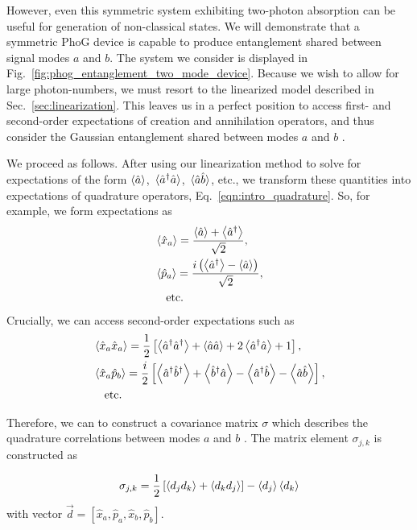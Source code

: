 However, even this symmetric system exhibiting two-photon absorption can be useful for generation of non-classical states. We will demonstrate that a symmetric PhoG device is capable to produce entanglement shared between signal modes $a$ and $b$. The system we consider is displayed in Fig.~\ref{fig:phog_entanglement_two_mode_device}. Because we wish to allow for large photon-numbers, we must resort to the linearized model described in Sec.~\ref{sec:linearization}. This leaves us in a perfect position to access first- and second-order expectations of creation and annihilation operators, and thus consider the Gaussian entanglement shared between modes $a$ and $b$ \cite{Weedbrook2012, Adesso2007a, Simon2000}.

We proceed as follows. After using our linearization method to solve for expectations of the form $\ev{\hat{a}}$, $\ev*{\hat{a}^\dagger \hat{a}}$, $\ev*{\hat{a}\hat{b}}$, etc., we transform these quantities into expectations of quadrature operators, Eq.~\ref{eqn:intro_quadrature}. So, for example, we form expectations as 
\begin{align}
&\ev{\hat{x}_a} = \frac{\ev{\hat{a}} + \ev{\hat{a}^\dagger}}{\sqrt{2}}, \notag \\
%
&\ev{\hat{p}_a} = \frac{i \left(\ev{\hat{a}^\dagger} - \ev{\hat{a}}\right)}{\sqrt{2}}, \notag \\
%
&\qq{etc.}\notag 
\end{align}
Crucially, we can access second-order expectations such as
\begin{align}
&\ev{\hat{x}_a \hat{x}_a} = \frac{1}{2}\left[\ev{\hat{a}^\dagger \hat{a}^\dagger} + \ev{\hat{a} \hat{a}} + 2 \ev{\hat{a}^\dagger \hat{a}} + 1\right], \notag \\
%
&\ev{\hat{x}_a \hat{p}_b} = \frac{i}{2}\left[\ev{\hat{a}^\dagger \hat{b}^\dagger} + \ev{\hat{b}^\dagger \hat{a}} - \ev{\hat{a}^\dagger \hat{b}} - \ev{\hat{a} \hat{b}} \right], \notag \\
%
&\qq{etc.} \notag
\end{align}

\noindent Therefore, we can to construct a covariance matrix $\sigma$ which describes the quadrature correlations between modes $a$ and $b$ \cite{Weedbrook2012}. The matrix element $\sigma_{j, k}$ is constructed as %

\begin{equation}\label{eqn:covariance matrix}
\sigma_{j, k} = \frac{1}{2} \left[ \ev{d_j d_k} + \ev{d_k d_j}\right] - \ev{d_j} \ev{d_k}
\end{equation}
with vector $\overrightarrow{d} = \left[\hat{x}_a, \hat{p}_a, \hat{x}_b, \hat{p}_b \right]$.

